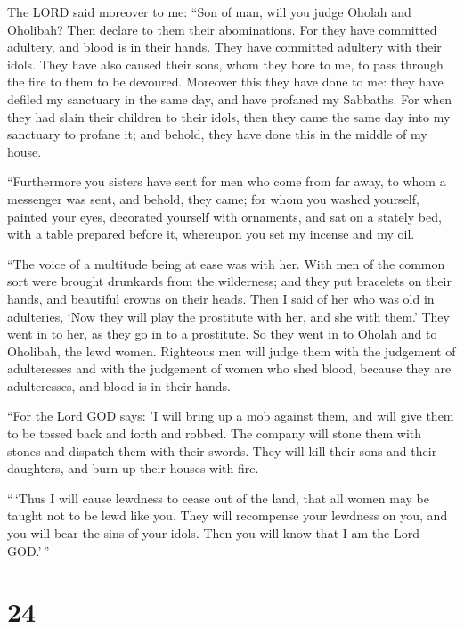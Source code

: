  The LORD said moreover to me: ``Son of man, will you judge
Oholah and Oholibah? Then declare to them their abominations.
 For they have committed adultery, and blood is in their
hands. They have committed adultery with their idols. They have also
caused their sons, whom they bore to me, to pass through the fire to
them to be devoured.  Moreover this they have done to me:
they have defiled my sanctuary in the same day, and have profaned my
Sabbaths.  For when they had slain their children to their
idols, then they came the same day into my sanctuary to profane it; and
behold, they have done this in the middle of my house.

 ``Furthermore you sisters have sent for men who come from
far away, to whom a messenger was sent, and behold, they came; for whom
you washed yourself, painted your eyes, decorated yourself with
ornaments,  and sat on a stately bed, with a table prepared
before it, whereupon you set my incense and my oil.

 ``The voice of a multitude being at ease was with her.
With men of the common sort were brought drunkards from the wilderness;
and they put bracelets on their hands, and beautiful crowns on their
heads.  Then I said of her who was old in adulteries, `Now
they will play the prostitute with her, and she with them.'
 They went in to her, as they go in to a prostitute. So
they went in to Oholah and to Oholibah, the lewd women. 
Righteous men will judge them with the judgement of adulteresses and
with the judgement of women who shed blood, because they are
adulteresses, and blood is in their hands.

 ``For the Lord GOD says: 'I will bring up a mob against
them, and will give them to be tossed back and forth and robbed.
 The company will stone them with stones and dispatch them
with their swords. They will kill their sons and their daughters, and
burn up their houses with fire.

 ``\,`Thus I will cause lewdness to cease out of the land,
that all women may be taught not to be lewd like you.  They
will recompense your lewdness on you, and you will bear the sins of your
idols. Then you will know that I am the Lord GOD.'\,''

\hypertarget{section-22}{%
\section{24}\label{section-22}}

